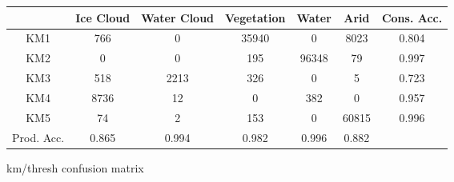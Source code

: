 \documentclass[12pt]{article}
\begin{document}
\begin{figure}[h!]
\centering
\begin{tabular}{C|CCCCC|C}
& \textnormal{Ice Cloud} & \textnormal{Water Cloud} & \textnormal{Vegetation} & \textnormal{Water} & \textnormal{Arid} & \textnormal{Cons. Acc.} \\
\hline
\textnormal{KM1} & 766 & 0 & 35940 & 0 & 8023 & 0.804 \\
\textnormal{KM2} & 0 & 0 & 195 & 96348 & 79 & 0.997 \\
\textnormal{KM3} & 518 & 2213 & 326 & 0 & 5 & 0.723 \\
\textnormal{KM4} & 8736 & 12 & 0 & 382 & 0 & 0.957 \\
\textnormal{KM5} & 74 & 2 & 153 & 0 & 60815 & 0.996 \\

\hline
\textnormal{Prod. Acc.} & 0.865 & 0.994 & 0.982 & 0.996 & 0.882\\
\end{tabular}
\caption{km/thresh confusion matrix}
\label{confusion_km-thresh}
\end{figure}


\clearpage
\end{document}
